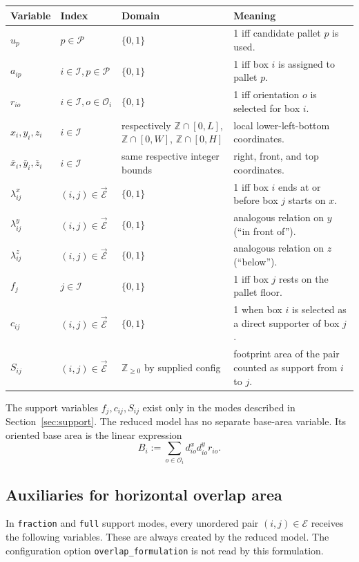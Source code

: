 \documentclass[11pt]{article}
\newcommand{\Items}{\mathcal I}
\newcommand{\Pallets}{\mathcal P}
\newcommand{\Orients}{\mathcal O}
\newcommand{\Pairs}{\mathcal E}
\newcommand{\OPairs}{\overrightarrow{\mathcal E}}
\newcommand{\B}{\{0,1\}}
\newcommand{\Z}{\mathbb Z}
\begin{document}
\begin{longtable}{@{}p{2.2cm}p{3.3cm}p{2.4cm}p{6.6cm}@{}}
\toprule
Variable & Index & Domain & Meaning \\
\midrule
\endhead
$u_p$ & $p\in\Pallets$ & $\B$ & 1 iff candidate pallet $p$ is used.\\
$a_{ip}$ & $i\in\Items,p\in\Pallets$ & $\B$ & 1 iff box $i$ is assigned to pallet $p$.\\
$r_{io}$ & $i\in\Items,o\in\Orients_i$ & $\B$ & 1 iff orientation $o$ is selected for box $i$.\\
$x_i,y_i,z_i$ & $i\in\Items$ & respectively $\Z\cap[0,L]$, $\Z\cap[0,W]$, $\Z\cap[0,H]$ & local lower-left-bottom coordinates.\\
$\bar x_i,\bar y_i,\bar z_i$ & $i\in\Items$ & same respective integer bounds & right, front, and top coordinates.\\
$\lambda^x_{ij}$ & $(i,j)\in\OPairs$ & $\B$ & 1 iff box $i$ ends at or before box $j$ starts on $x$.\\
$\lambda^y_{ij}$ & $(i,j)\in\OPairs$ & $\B$ & analogous relation on $y$ (``in front of'').\\
$\lambda^z_{ij}$ & $(i,j)\in\OPairs$ & $\B$ & analogous relation on $z$ (``below'').\\
$f_j$ & $j\in\Items$ & $\B$ & 1 iff box $j$ rests on the pallet floor.\\
$c_{ij}$ & $(i,j)\in\OPairs$ & $\B$ & 1 when box $i$ is selected as a direct supporter of box $j$.\\
$S_{ij}$ & $(i,j)\in\OPairs$ & $\Z_{\ge0}$ by supplied config & footprint area of the pair counted as support from $i$ to $j$.\\
\bottomrule
\end{longtable}

The support variables $f_j,c_{ij},S_{ij}$ exist only in the modes described in
Section~\ref{sec:support}.  The reduced model has no separate base-area
variable.  Its oriented base area is the linear expression
\begin{equation}
 B_i:=\sum_{o\in\Orients_i}d^x_{io}d^y_{io}r_{io}.
 \label{eq:base-expression}
\end{equation}

\subsection{Auxiliaries for horizontal overlap area}

In \texttt{fraction} and \texttt{full} support modes, every unordered pair
$(i,j)\in\Pairs$ receives the following variables.  These are always created
by the reduced model.  The configuration option
\texttt{overlap\_formulation} is not read by this formulation.
\end{document}
